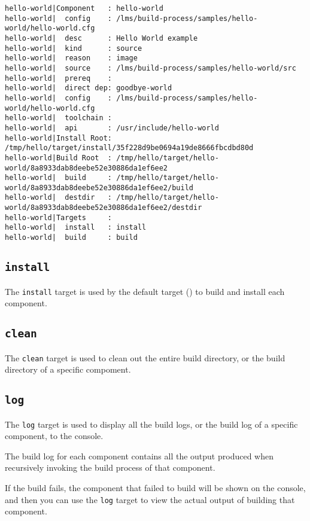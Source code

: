 \begin{footnotesize}
\begin{verbatim}
hello-world|Component   : hello-world
hello-world|  config    : /lms/build-process/samples/hello-world/hello-world.cfg
hello-world|  desc      : Hello World example
hello-world|  kind      : source
hello-world|  reason    : image
hello-world|  source    : /lms/build-process/samples/hello-world/src
hello-world|  prereq    :
hello-world|  direct dep: goodbye-world
hello-world|  config    : /lms/build-process/samples/hello-world/hello-world.cfg
hello-world|  toolchain :
hello-world|  api       : /usr/include/hello-world
hello-world|Install Root: /tmp/hello/target/install/35f228d9be0694a19de8666fbcdbd80d
hello-world|Build Root  : /tmp/hello/target/hello-world/8a8933dab8deebe52e30886da1ef6ee2
hello-world|  build     : /tmp/hello/target/hello-world/8a8933dab8deebe52e30886da1ef6ee2/build
hello-world|  destdir   : /tmp/hello/target/hello-world/8a8933dab8deebe52e30886da1ef6ee2/destdir
hello-world|Targets     :
hello-world|  install   : install
hello-world|  build     : build
\end{verbatim}
\end{footnotesize}

\subsection{\texttt{install}}

The \texttt{install} target is used by the default target
() to build and install each component.

\subsection{\texttt{clean}}

The \texttt{clean} target is used to clean out the entire build
directory, or the build directory of a specific compoment.

\subsection{\texttt{log}}

The \texttt{log} target is used to display all the build logs, or the
build log of a specific component, to the console.

The build log for each component contains all the output produced when
recursively invoking the build process of that component.

If the build fails, the component that failed to build will be shown
on the console, and then you can use the \texttt{log} target to view
the actual output of building that component.


